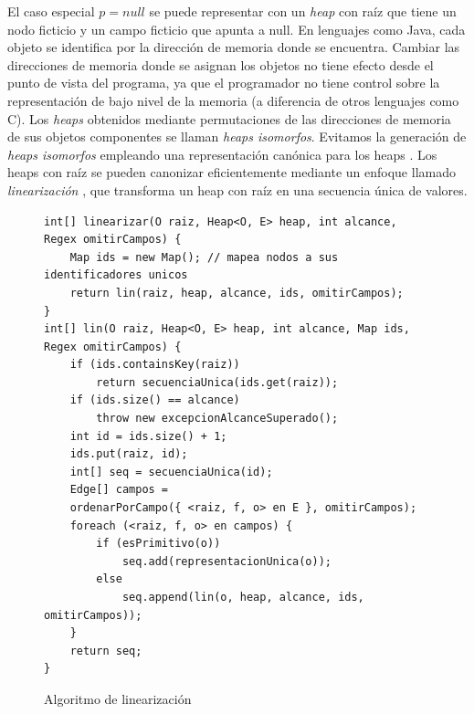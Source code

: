 El caso especial $p = null$ se puede representar con un \emph{heap} con raíz que tiene un nodo ficticio y un campo ficticio que apunta a null. En lenguajes como Java, cada objeto se identifica por la dirección de memoria donde se encuentra. Cambiar las direcciones de memoria donde se asignan los objetos no tiene efecto desde el punto de vista del programa, ya que el programador no tiene control sobre la representación de bajo nivel de la memoria (a diferencia de otros lenguajes como C). Los \emph{heaps} obtenidos mediante permutaciones de las direcciones de memoria de sus objetos componentes se llaman \emph{heaps isomorfos}. Evitamos la generación de \emph{heaps isomorfos} empleando una representación canónica para los heaps \cite{Iosif02,Boyapati02}. Los heaps con raíz se pueden canonizar eficientemente mediante un enfoque llamado \emph{linearización} \cite{Iosif02,Xie04}, que transforma un heap con raíz en una secuencia única de valores.

\bigbreak

\begin{figure}[!th]
\begin{lstlisting}
int[] linearizar(O raiz, Heap<O, E> heap, int alcance, Regex omitirCampos) {
    Map ids = new Map(); // mapea nodos a sus identificadores unicos
    return lin(raiz, heap, alcance, ids, omitirCampos);
}
int[] lin(O raiz, Heap<O, E> heap, int alcance, Map ids, Regex omitirCampos) {
    if (ids.containsKey(raiz))
        return secuenciaUnica(ids.get(raiz));
    if (ids.size() == alcance)
        throw new excepcionAlcanceSuperado();
    int id = ids.size() + 1;
    ids.put(raiz, id);
    int[] seq = secuenciaUnica(id);
    Edge[] campos =
    ordenarPorCampo({ <raiz, f, o> en E }, omitirCampos);
    foreach (<raiz, f, o> en campos) {
        if (esPrimitivo(o))
            seq.add(representacionUnica(o));
        else
            seq.append(lin(o, heap, alcance, ids, omitirCampos));
    }
    return seq;
}
\end{lstlisting}
\caption{Algoritmo de linearización}
\label{alg:linearization}
\end{figure}





